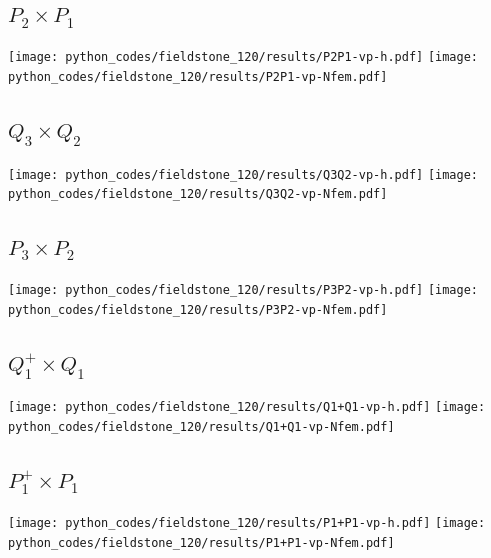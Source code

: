\subsection*{$P_2\times P_1$}
\begin{center}
\texttt{[image: python\_codes/fieldstone\_120/results/P2P1-vp-h.pdf]}
\texttt{[image: python\_codes/fieldstone\_120/results/P2P1-vp-Nfem.pdf]}
\end{center}

\subsection*{$Q_3\times Q_2$}
\begin{center}
\texttt{[image: python\_codes/fieldstone\_120/results/Q3Q2-vp-h.pdf]}
\texttt{[image: python\_codes/fieldstone\_120/results/Q3Q2-vp-Nfem.pdf]}
\end{center}

\subsection*{$P_3\times P_2$}
\begin{center}
\texttt{[image: python\_codes/fieldstone\_120/results/P3P2-vp-h.pdf]}
\texttt{[image: python\_codes/fieldstone\_120/results/P3P2-vp-Nfem.pdf]}
\end{center}

\newpage
\subsection*{$Q_1^+\times Q_1$}
\begin{center}
\texttt{[image: python\_codes/fieldstone\_120/results/Q1+Q1-vp-h.pdf]}
\texttt{[image: python\_codes/fieldstone\_120/results/Q1+Q1-vp-Nfem.pdf]}
\end{center}

\subsection*{$P_1^+\times P_1$}
\begin{center}
\texttt{[image: python\_codes/fieldstone\_120/results/P1+P1-vp-h.pdf]}
\texttt{[image: python\_codes/fieldstone\_120/results/P1+P1-vp-Nfem.pdf]}
\end{center}

